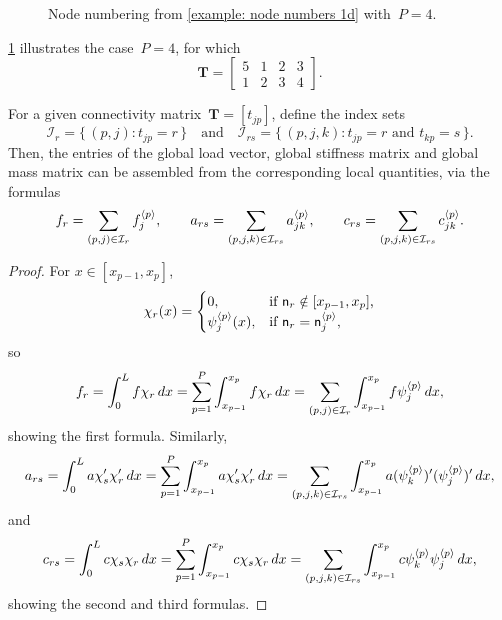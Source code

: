 \begin{figure}
\caption{Node numbering from \cref{example: node numbers 1d} with~$P=4$.}
\label{fig: node numbers 1d}
\begin{center}
\end{center}
\end{figure}

\begin{example}\label{example: node numbers 1d}
\cref{fig: node numbers 1d} illustrates the case~$P=4$, for which
\[
\boldsymbol{T}=\begin{bmatrix}
5&1&2&3\\
1&2&3&4\end{bmatrix}.
\]
\end{example}

\begin{theorem}
For a given connectivity matrix~$\boldsymbol{T}=[t_{jp}]$, define the index sets
\[
\mathcal{I}_r=\{\,(p,j):t_{jp}=r\,\}
\quad\text{and}\quad
\mathcal{I}_{rs}=\{\,(p,j,k):\text{$t_{jp}=r$ and $t_{kp}=s$}\,\}.
\]
Then, the entries of the global load vector, global stiffness matrix and global 
mass matrix can be assembled from the corresponding local quantities, via the 
formulas
\[
f_r=\sum_{(p,j)\in\mathcal{I}_r}f^{\langle p\rangle}_j,\qquad
a_{rs}=\sum_{(p,j,k)\in\mathcal{I}_{rs}}a^{\langle p\rangle}_{jk},\qquad
c_{rs}=\sum_{(p,j,k)\in\mathcal{I}_{rs}}c^{\langle p\rangle}_{jk}.
\]
\end{theorem}
\begin{proof}
For $x\in[x_{p-1},x_p]$,
\[
\chi_r(x)=\begin{cases}
0,&\text{if $\mathsf{n}_r\notin[x_{p-1},x_p]$,}\\
\psi^{\langle p\rangle}_j(x),&\text{if $\mathsf{n}_r=\mathsf{n}^{\langle p\rangle}_j$,}        
\end{cases}
\]
so
\[
f_r=\int_0^Lf\chi_r\,dx=\sum_{p=1}^P\int_{x_{p-1}}^{x_p}f\chi_r\,dx
    =\sum_{(p,j)\in\mathcal{I}_r}\int_{x_{p-1}}^{x_p}f\psi^{\langle p\rangle}_j\,dx,
\]
showing the first formula. Similarly, 
\[
a_{rs}=\int_0^La\chi_s'\chi_r'\,dx=\sum_{p=1}^P\int_{x_{p-1}}^{x_p}
a\chi_s'\chi_r'\,dx=\sum_{(p,j,k)\in\mathcal{I}_{rs}}\int_{x_{p-1}}^{x_p}
a(\psi^{\langle p\rangle}_k)'(\psi^{\langle p\rangle}_j)'\,dx,
\]
and
\[
c_{rs}=\int_0^Lc\chi_s\chi_r\,dx=\sum_{p=1}^P\int_{x_{p-1}}^{x_p}
c\chi_s\chi_r\,dx=\sum_{(p,j,k)\in\mathcal{I}_{rs}}\int_{x_{p-1}}^{x_p}
c\psi^{\langle p\rangle}_k\psi^{\langle p\rangle}_j\,dx,
\]
showing the second and third formulas.
\end{proof}

